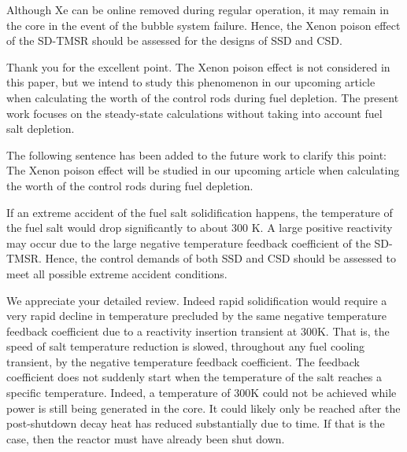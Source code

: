 \documentclass[answers,11pt]{exam}
\begin{document}
\begin{questions}
\begin{solution}
        \end{solution}

        \question  Although Xe can be online removed during regular operation, it may remain in the core in the event of the bubble system failure. Hence, the Xenon poison effect of the SD-TMSR should be assessed for the designs of SSD and CSD. 
        \begin{solution}
		         
		         Thank you for the excellent point. The Xenon poison effect is not considered in this paper, but we intend to study this phenomenon in our upcoming article when calculating the worth of the control rods during fuel depletion. The present work focuses on the steady-state calculations without taking into account fuel salt depletion.
		         
		         The following sentence has been added to the future work to clarify this point:\\
		         
		         The Xenon poison effect will be studied in our upcoming article when calculating the worth of the control rods during fuel depletion.
		          
		           
    
        \end{solution}

	
	\question If an extreme accident of the fuel salt solidification happens, the temperature of the fuel salt would drop significantly to about 300 K. A large positive reactivity may occur due to the large negative temperature feedback coefficient of the SD-TMSR. Hence, the control demands of both SSD and CSD should be assessed to meet all possible extreme accident conditions.
	\begin{solution}
		
	We appreciate your detailed review.
	Indeed rapid solidification would require a very rapid decline in temperature precluded by the same negative temperature feedback coefficient due to a reactivity insertion transient at 300K. That is, the speed of salt temperature reduction is slowed, throughout any fuel cooling transient, by the negative temperature feedback coefficient. The feedback coefficient does not suddenly start when the temperature of the salt reaches a specific temperature. Indeed, a temperature of 300K could not be achieved while power is still being generated in the core. It could likely only be reached after the post-shutdown decay heat has reduced substantially due to time. If that is the case, then the reactor must have already been shut down.
	

\end{solution}
\end{questions}
\end{document}
